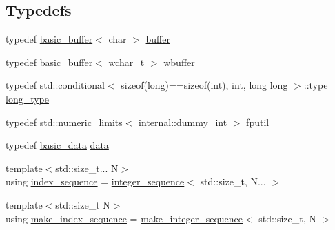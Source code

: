 \subsection*{Typedefs}
\begin{DoxyCompactItemize}
\item 
typedef \hyperlink{classinternal_1_1basic__buffer}{basic\+\_\+buffer}$<$ char $>$ \hyperlink{namespaceinternal_a5fcdbc3efad1f390e6c3f0fdafa56122}{buffer}
\item 
typedef \hyperlink{classinternal_1_1basic__buffer}{basic\+\_\+buffer}$<$ wchar\+\_\+t $>$ \hyperlink{namespaceinternal_a6d6bf139e2a200cfb80dfcb8a0da048e}{wbuffer}
\item 
typedef std\+::conditional$<$ sizeof(long)==sizeof(int), int, long long $>$\+::\hyperlink{namespaceinternal_a8661864098ac0acff9a6dd7e66f59038}{type} \hyperlink{namespaceinternal_a0e92ff50bf0626d16bd3c814946ecd3d}{long\+\_\+type}
\item 
typedef std\+::numeric\+\_\+limits$<$ \hyperlink{structinternal_1_1dummy__int}{internal\+::dummy\+\_\+int} $>$ \hyperlink{namespaceinternal_aa7d06ba7f624d16317103f85ae364c7f}{fputil}
\item 
typedef \hyperlink{structinternal_1_1basic__data}{basic\+\_\+data} \hyperlink{namespaceinternal_adc3036f1841136e36e29e5fd339de1a1}{data}
\item 
{\footnotesize template$<$std\+::size\+\_\+t... N$>$ }\\using \hyperlink{namespaceinternal_a934b7952794e1164012436fcd82abb6b}{index\+\_\+sequence} = \hyperlink{structinternal_1_1integer__sequence}{integer\+\_\+sequence}$<$ std\+::size\+\_\+t, N... $>$
\item 
{\footnotesize template$<$std\+::size\+\_\+t N$>$ }\\using \hyperlink{namespaceinternal_ac3a4f2187fce6a6dfd5576bd311c9876}{make\+\_\+index\+\_\+sequence} = \hyperlink{structinternal_1_1make__integer__sequence}{make\+\_\+integer\+\_\+sequence}$<$ std\+::size\+\_\+t, N $>$
\end{DoxyCompactItemize}
